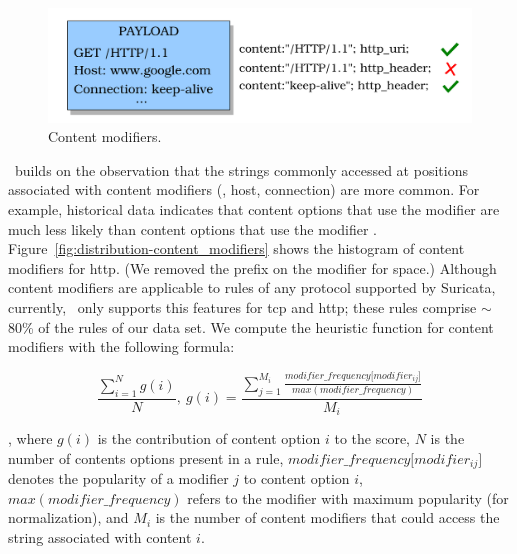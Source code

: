 \documentclass[sigconf,review, anonymous]{acmart}
\begin{document}
\begin{figure}[t!]
\centering
\includegraphics[scale=0.5]{figs/http_header-example.png}
\vspace{-2ex}
\caption{Content modifiers.}
\label{fig:http-header-example}
\end{figure}

\tname\ builds on the observation that the strings commonly accessed
at positions associated with content modifiers (\eg{}, host,
connection) are more common. For example, historical data indicates
that content options that use the modifier  are
much less likely than content options that use the modifier
. Figure~\ref{fig:distribution-content_modifiers} shows
the histogram of content modifiers for http. (We removed the prefix
 on the modifier for space.) Although content modifiers
are applicable to rules of any protocol supported by Suricata,
currently, \tname\ only supports this features for tcp and http; these
rules comprise $\sim$80\% of the rules of our data set. We compute the
heuristic function for content modifiers with the following formula:

\[\frac{\sum_{i=1}^{N}g(i)}{N},~g(i)=\frac{\sum_{j=1}^{M_i}\frac{\mathit{modifier\_frequency[modifier_{ij}}]}{\mathit{max(modifier\_frequency)}}}{M_i}\]

\noindent
, where $g(i)$ is the contribution of content option $i$ to the score,
$N$ is the number of contents options present in a rule,
$\mathit{modifier\_frequency[modifier_{ij}}]$ denotes the popularity
of a modifier $j$ to content option $i$,
$\mathit{max(modifier\_frequency)}$ refers to the modifier with
maximum popularity (for normalization), and $M_i$ is the number of
content modifiers that could access the string associated with content
$i$.
    
\end{document}
